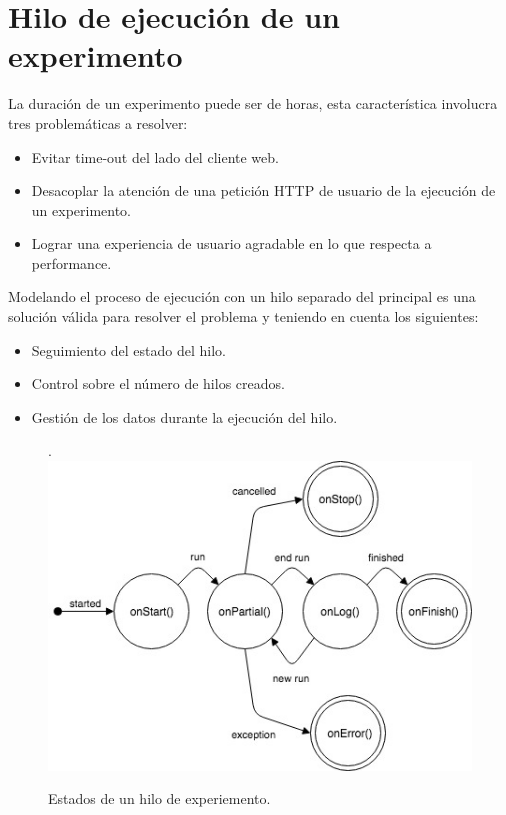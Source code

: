 \section{Hilo de ejecuci\'on de un experimento}

La duraci\'on de un experimento puede ser de horas, esta caracter\'istica involucra tres problem\'aticas
a resolver:

\begin{itemize}
    \item Evitar time-out del lado del cliente web.
    \item Desacoplar la atenci\'on de una petici\'on HTTP de usuario de la ejecuci\'on de un experimento.
    \item Lograr una experiencia de usuario agradable en lo que respecta a performance.
\end{itemize}

Modelando el proceso de ejecuci\'on con un hilo separado del principal es una soluci\'on
v\'alida para resolver el problema y teniendo en cuenta los siguientes:

\begin{itemize}
    \item Seguimiento del estado del hilo.
    \item Control sobre el n\'umero de hilos creados.
    \item Gesti\'on de los datos durante la ejecuci\'on del hilo.
\end{itemize}

\begin{figure}[!htb].
    \includegraphics[width=\linewidth]{../figures/d14.jpg}
    \caption{Estados de un hilo de experiemento.}
    \label{fig:d14}
\end{figure}

\newpage